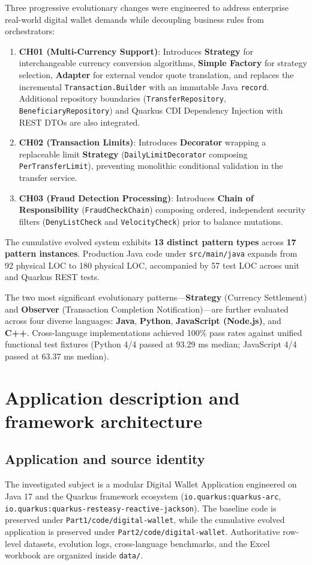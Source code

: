 \documentclass[11pt,a4paper]{article}
\begin{document}
Three progressive evolutionary changes were engineered to address enterprise real-world digital wallet demands while decoupling business rules from orchestrators:
\begin{enumerate}
    \item \textbf{CH01 (Multi-Currency Support)}: Introduces \textbf{Strategy} for interchangeable currency conversion algorithms, \textbf{Simple Factory} for strategy selection, \textbf{Adapter} for external vendor quote translation, and replaces the incremental \texttt{Transaction.Builder} with an immutable Java \texttt{record}. Additional repository boundaries (\texttt{TransferRepository}, \texttt{BeneficiaryRepository}) and Quarkus CDI Dependency Injection with REST DTOs are also integrated.
    \item \textbf{CH02 (Transaction Limits)}: Introduces \textbf{Decorator} wrapping a replaceable limit \textbf{Strategy} (\texttt{DailyLimitDecorator} composing \texttt{PerTransferLimit}), preventing monolithic conditional validation in the transfer service.
    \item \textbf{CH03 (Fraud Detection Processing)}: Introduces \textbf{Chain of Responsibility} (\texttt{FraudCheckChain}) composing ordered, independent security filters (\texttt{DenyListCheck} and \texttt{VelocityCheck}) prior to balance mutations.
\end{enumerate}

The cumulative evolved system exhibits \textbf{13 distinct pattern types} across \textbf{17 pattern instances}. Production Java code under \texttt{src/main/java} expands from 92 physical LOC to 180 physical LOC, accompanied by 57 test LOC across unit and Quarkus REST tests.

The two most significant evolutionary patterns---\textbf{Strategy} (Currency Settlement) and \textbf{Observer} (Transaction Completion Notification)---are further evaluated across four diverse languages: \textbf{Java}, \textbf{Python}, \textbf{JavaScript (Node.js)}, and \textbf{C++}. Cross-language implementations achieved 100\% pass rates against unified functional test fixtures (Python 4/4 passed at 93.29 ms median; JavaScript 4/4 passed at 63.37 ms median).

\section{Application description and framework architecture}

\subsection{Application and source identity}
The investigated subject is a modular Digital Wallet Application engineered on Java 17 and the Quarkus framework ecosystem (\texttt{io.quarkus:quarkus-arc}, \texttt{io.quarkus:quarkus-resteasy-reactive-jackson}). The baseline code is preserved under \texttt{Part1/code/digital-wallet}, while the cumulative evolved application is preserved under \texttt{Part2/code/digital-wallet}. Authoritative row-level datasets, evolution logs, cross-language benchmarks, and the Excel workbook are organized inside \texttt{data/}.
\end{document}
